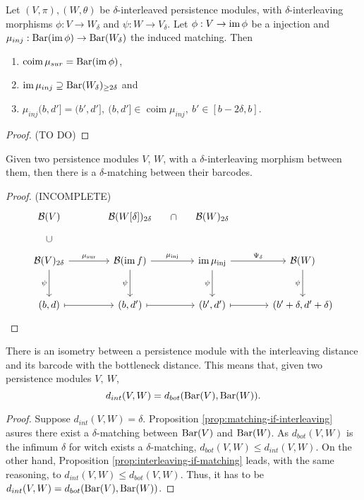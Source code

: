 \begin{lemma}
    Let $ (V, \pi), (W, \theta) $ be $\delta$-interleaved persistence modules, with $\delta$-interleaving morphisms $ \phi: V \to W_\delta $ and $ \psi: W \to V_\delta $. Let $ \phi: V \to \operatorname{im}\phi $ be a injection and $ \mu_{inj}: \operatorname{Bar}(\operatorname{im} \phi) \to \operatorname{Bar} (W_\delta)$ the induced matching. Then
    \begin{enumerate}
        \item $\operatorname{coim} \mu_{sur} = \operatorname{Bar} (\operatorname{im} \phi) $,
        \item $ \operatorname{im} \mu_{inj} \supseteq \operatorname{Bar} (W_\delta)_{\geq 2\delta} $ and
        \item $ \mu_{inj}(b, d'] = (b', d'], \ (b, d'] \in \operatorname{coim} \mu_{inj}, \ b' \in [b-2\delta, b]$.
    \end{enumerate}
\end{lemma}
\begin{proof}
    (TO DO)
\end{proof}

\begin{proposition}\label{prop:matching-if-interleaving}
    Given two persistence modules $ V $, $ W $, with a $\delta$-interleaving morphism between them, then there is a $ \delta$-matching between their barcodes.
\end{proposition}
\begin{proof}
    (INCOMPLETE)
    $$
    \begin{tikzcd}[column sep=large, row sep=large]
        \mathcal{B}(V) & \mathcal{B}(W[\delta])_{2\delta} \arrow[r, phantom, "\cap"] & \mathcal{B}(W)_{2\delta} \\
        \mathcal{B}(V)_{2\delta} \arrow[u, phantom, "\cup"] \arrow[r, "\mu_{\text{sur}}"] \arrow[d, "\psi"'] & \mathcal{B}(\mathrm{im}\,f) \arrow[r, "\mu_{\text{inj}}"] \arrow[d, "\psi"'] & \mathrm{im}\,\mu_{\text{inj}} \arrow[r, "\Psi_\delta"] \arrow[d, "\psi"'] & \mathcal{B}(W) \arrow[d, "\psi"'] \\
        (b, d) \arrow[r, mapsto] & (b, d') \arrow[r, mapsto] & (b', d') \arrow[r, mapsto] & (b' + \delta, d' + \delta)
    \end{tikzcd}
    $$
\end{proof}

\begin{theorem}[Stability]
    There is an isometry between a persistence module with the interleaving distance and its barcode with the bottleneck distance. This means that, given two persistence modules $ V, \ W $, 
    $$ 
        d_{int} (V, W) = d_{bot} (\operatorname{Bar}(V), \operatorname{Bar}(W)).
    $$
\end{theorem}
\begin{proof}
    Suppose $ d_{int}(V, W) = \delta $. Proposition \ref{prop:matching-if-interleaving} asures there exist a $\delta$-matching between $ \operatorname{Bar}(V) $ and $ \operatorname{Bar} (W) $. As $ d_{bot}(V, W) $ is the infimum $\delta$ for witch exists a $\delta$-matching, $ d_{bot}(V, W) \leq d_{int}(V, W)$. On the other hand, Proposition \ref{prop:interleaving-if-matching} leads, with the same reasoning, to $ d_{int}(V, W) \leq d_{bot}(V, W)$. Thus, it has to be $ d_{int} (V, W) = d_{bot} (\operatorname{Bar}(V), \operatorname{Bar}(W)) $.
\end{proof}
